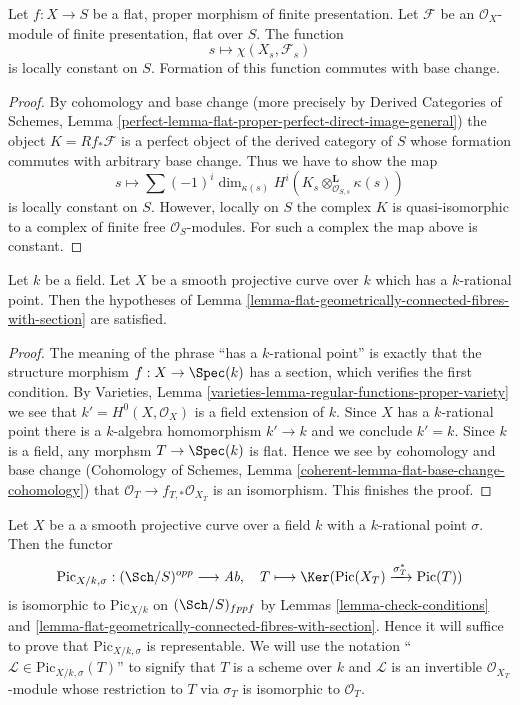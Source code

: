 \begin{lemma}
\label{lemma-chi-constant}
Let $f : X \to S$ be a flat, proper morphism of finite presentation.
Let $\mathcal{F}$ be an $\mathcal{O}_X$-module of finite presentation,
flat over $S$. The function
$$
s \longmapsto \chi(X_s, \mathcal{F}_s)
$$
is locally constant on $S$. Formation of this function commutes with
base change.
\end{lemma}

\begin{proof}
By cohomology and base change (more precisely by
Derived Categories of Schemes, Lemma
\ref{perfect-lemma-flat-proper-perfect-direct-image-general})
the object $K = Rf_*\mathcal{F}$ is a perfect object of the derived
category of $S$ whose formation commutes with arbitrary base change.
Thus we have to show the map
$$
s \longmapsto \sum (-1)^i \dim_{\kappa(s)}
H^i(K_s \otimes^\mathbf{L}_{\mathcal{O}_{S, s}} \kappa(s))
$$
is locally constant on $S$. However, locally on $S$ the complex
$K$ is quasi-isomorphic to a complex of finite free $\mathcal{O}_S$-modules.
For such a complex the map above is constant.
\end{proof}

\begin{lemma}
\label{lemma-check-conditions}
Let $k$ be a field. Let $X$ be a smooth projective curve over $k$
which has a $k$-rational point. Then the hypotheses of
Lemma \ref{lemma-flat-geometrically-connected-fibres-with-section}
are satisfied.
\end{lemma}

\begin{proof}
The meaning of the phrase ``has a $k$-rational point'' is exactly that
the structure morphism $f : X \to \Spec(k)$ has a section, which
verifies the first condition.
By Varieties, Lemma \ref{varieties-lemma-regular-functions-proper-variety}
we see that $k' = H^0(X, \mathcal{O}_X)$ is a field extension of $k$.
Since $X$ has a $k$-rational point there is a $k$-algebra homomorphism
$k' \to k$ and we conclude $k' = k$.
Since $k$ is a field, any morphsm $T \to \Spec(k)$ is flat.
Hence we see by cohomology and base change
(Cohomology of Schemes, Lemma \ref{coherent-lemma-flat-base-change-cohomology})
that $\mathcal{O}_T \to f_{T, *}\mathcal{O}_{X_T}$ is an isomorphism.
This finishes the proof.
\end{proof}

\noindent
Let $X$ be a a smooth projective curve over a field $k$ with a
$k$-rational point $\sigma$. Then the functor
$$
\text{Pic}_{X/k, \sigma} : (\Sch/S)^{opp} \longrightarrow \textit{Ab},\quad
T \longmapsto \Ker(\text{Pic}(X_T) \xrightarrow{\sigma_T^*} \text{Pic}(T))
$$
is isomorphic to $\text{Pic}_{X/k}$ on $(\Sch/S)_{fppf}$
by Lemmas \ref{lemma-check-conditions} and
\ref{lemma-flat-geometrically-connected-fibres-with-section}.
Hence it will suffice to prove that $\text{Pic}_{X/k, \sigma}$
is representable. We will use the notation
``$\mathcal{L} \in \text{Pic}_{X/k, \sigma}(T)$'' to signify that
$T$ is a scheme over $k$ and $\mathcal{L}$ is an invertible
$\mathcal{O}_{X_T}$-module whose restriction to $T$ via $\sigma_T$
is isomorphic to $\mathcal{O}_T$.

